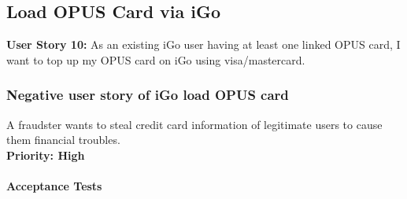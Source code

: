 \documentclass[11pt, english]{report}
\begin{document}
\vspace*{0.2in}
\subsection{Load OPUS Card via iGo}
\textbf{User Story 10: }
As an existing iGo user having at least one linked OPUS card, I want to top up my OPUS card on iGo using visa/mastercard.

\subsubsection{Negative user story of iGo load OPUS card}
A fraudster wants to steal credit card information of legitimate users to cause them financial troubles.
\\ 
\textbf{Priority: High}\\ \\
\textbf{Acceptance Tests} \\ \\ 
\setlength{\tabcolsep}{18pt}
\renewcommand{\arraystretch}{1.5}
\end{document}
